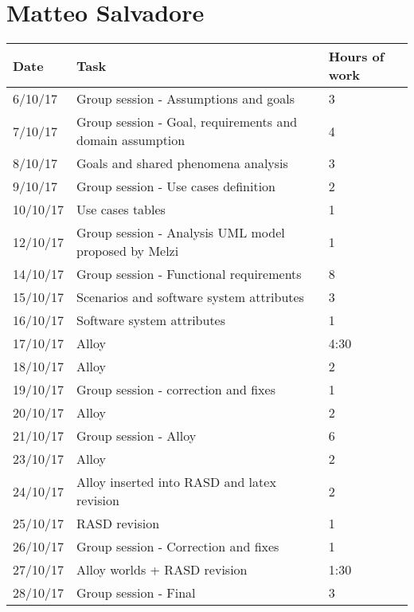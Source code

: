 \section{Matteo Salvadore}
\begin{table}[H]
	\begin{tabular}{ p{2cm} p{8cm} p{3cm}}
	Date & Task & Hours of work\\
	\hline
	6/10/17  & Group session - Assumptions and goals & 3 \\
	7/10/17  & Group session - Goal, requirements and domain assumption & 4 \\
	8/10/17  & Goals and shared phenomena analysis  & 3 \\
	9/10/17  & Group session - Use cases definition & 2 \\
	10/10/17  & Use cases tables & 1 \\
	12/10/17  & Group session - Analysis UML model proposed by Melzi & 1 \\
	14/10/17  & Group session - Functional requirements & 8 \\
	15/10/17  & Scenarios and software system attributes & 3 \\
	16/10/17  & Software system attributes & 1 \\
	17/10/17  & Alloy & 4:30  \\
	18/10/17  & Alloy & 2 \\
	19/10/17  & Group session - correction and fixes & 1 \\
	20/10/17   & Alloy & 2 \\
	21/10/17  & Group session - Alloy & 6 \\
	23/10/17  & Alloy & 2 \\
	24/10/17  & Alloy inserted into RASD and latex revision & 2 \\
	25/10/17  & RASD revision & 1 \\
	26/10/17  & Group session - Correction and fixes & 1 \\
	27/10/17  & Alloy worlds + RASD revision & 1:30 \\
	28/10/17  & Group session - Final  & 3 \\
	\end{tabular}
\end{table}